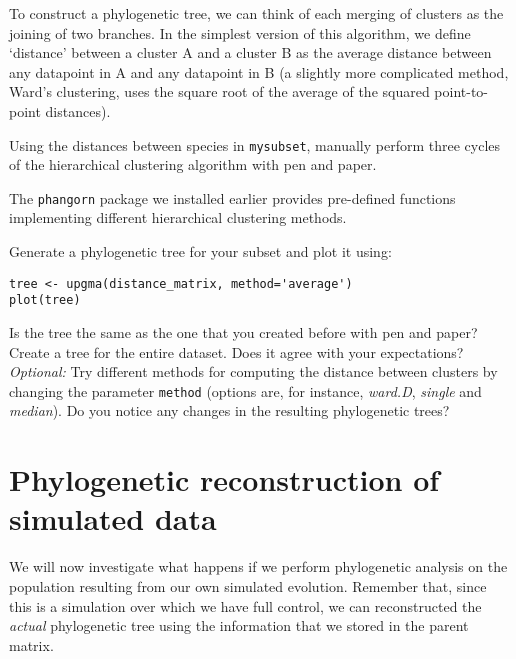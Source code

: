 \documentclass[a4paper, 9pt]{article}
\begin{document}
To construct a phylogenetic tree, we can think of each merging of
clusters as the joining of two branches. In the simplest version of this
algorithm, we define `distance' between a cluster A and a cluster B as
the average distance between any datapoint in A and any datapoint in B
(a slightly more complicated method, Ward's clustering, uses the square
root of the average of the squared point-to-point distances).

\begin{exercise}
    \askstar Using the distances between species in \texttt{mysubset}, manually perform three cycles of the hierarchical clustering algorithm with pen and paper.
\end{exercise}

The \texttt{phangorn} package we installed earlier provides pre-defined
functions implementing different hierarchical clustering methods.

\begin{exercise}
    \action Generate a phylogenetic tree for your subset and plot it using:\begin{lstlisting}
tree <- upgma(distance_matrix, method='average')
plot(tree)\end{lstlisting}
Is the tree the same as the one that you created before with pen and paper?
\action Create a tree for the entire dataset. Does it agree with your expectations?
\action \emph{Optional:} Try different methods for computing the distance between clusters by changing the parameter \texttt{method} (options are, for instance, \textit{ward.D}, \textit{single} and \textit{median}). Do you notice any changes in the resulting phylogenetic trees?
\end{exercise}

\section{Phylogenetic reconstruction of simulated
data}\label{phylogenetic-reconstruction-of-simulated-data}

We will now investigate what happens if we perform phylogenetic analysis
on the population resulting from our own simulated evolution. Remember
that, since this is a simulation over which we have full control, we can
reconstructed the \emph{actual} phylogenetic tree using the information
that we stored in the parent matrix.
\end{document}
